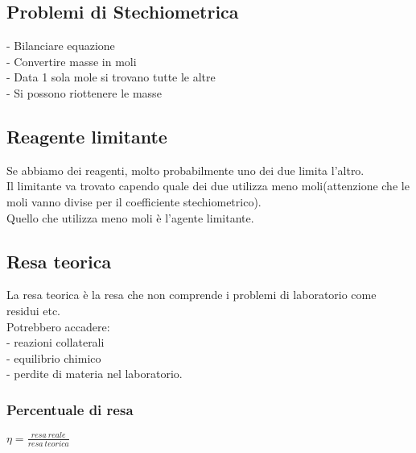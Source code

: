 \subsection{Problemi di Stechiometrica}
- Bilanciare equazione\\
- Convertire masse in moli\\
- Data 1 sola mole si trovano tutte le altre\\
- Si possono riottenere le masse
\subsection{Reagente limitante}
Se abbiamo dei reagenti, molto probabilmente uno dei due limita l'altro.\\
Il limitante va trovato capendo quale dei due utilizza meno moli(attenzione che le moli vanno divise per il coefficiente stechiometrico).\\
Quello che utilizza meno moli è l'agente limitante.
\subsection{Resa teorica}
La resa teorica è la resa che non comprende i problemi di laboratorio come residui etc.\\
Potrebbero accadere:\\
\tab- reazioni collaterali\\
\tab- equilibrio chimico\\
\tab- perdite di materia nel laboratorio.
\subsubsection{Percentuale di resa}
$\eta = \frac{resa\ reale}{resa\ teorica}$